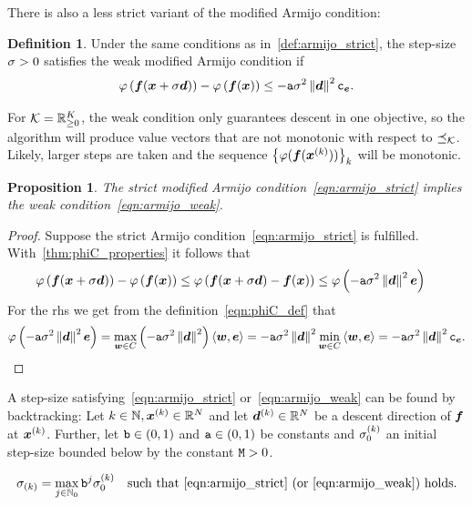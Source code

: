 \documentclass{article}
\theoremstyle{plain}
\newtheorem{proposition}[theorem]{Proposition}
\theoremstyle{definition}
\newtheorem{definition}[theorem]{Definition}
\begin{document}
There is also a less strict variant of the modified Armijo condition:
\begin{definition}
	Under the same conditions as in~\cref{def:armijo_strict},
	the step-size $\sigma > 0$ satisfies the weak modified Armijo condition if 
	\begin{equation}
		\varphi\left(\bm{f}(\bm{x} + \sigma\bm{d})\right)
		- 
		\varphi\left(\bm{f}(\bm{x})\right)
		\leq
		-
		\mathtt{a} \sigma^2 \left\|\bm{d}\right\|^2 \mathtt{c}_{\bm{e}}.
		\label{eqn:armijo_weak}
	\end{equation}
\end{definition}
For $\mathcal K = \mathbb R^K_{\geq 0}$, the weak condition only guarantees descent in one objective,
so the algorithm will produce value vectors that are not monotonic with respect to $\preceq_\mathcal K$.
Likely, larger steps are taken and the sequence $\left\{\varphi(\bm{f}(\bm{x}^{(k)}))\right\}_k$ will be monotonic.
\begin{proposition}
	The strict modified Armijo condition~\eqref{eqn:armijo_strict} implies the weak 
	condition~\eqref{eqn:armijo_weak}.
\end{proposition}
\begin{proof}
	Suppose the strict Armijo condition~\eqref{eqn:armijo_strict} is fulfilled.
	With~\cref{thm:phiC_properties} it follows that 
	\begin{align*}
	\varphi\left(
		\bm{f}(\bm{x} + \sigma \bm{d})
	\right)
	-
	\varphi\left(
		\bm{f}(\bm{x})
	\right)
	&\le
	\varphi\left(
		\bm{f}(\bm{x} + \sigma \bm{d})
		-
		\bm{f}(\bm{x})
	\right)
	\le
	\varphi\left(
	- \mathtt{a} \sigma^2 \left\|\bm{d}\right\|^2 \bm{e}
	\right)
	\end{align*}
	For the \ac{rhs} we get from the definition~\eqref{eqn:phiC_def} that
	$$
	\varphi\left(
	- \mathtt{a} \sigma^2 \left\|\bm{d}\right\|^2 \bm{e}
	\right)
	=
	\max_{\bm{w} \in C}
	\left(- \mathtt{a} \sigma^2 \left\|\bm{d}\right\|^2\right)
	\left\langle \bm{w}, \bm{e} \right\rangle
	= 
	- \mathtt{a} \sigma^2 \left\|\bm{d}\right\|^2
	\min_{\bm{w}\in C}
	\left\langle \bm{w}, \bm{e} \right\rangle
	=
	- \mathtt{a} \sigma^2 \left\|\bm{d}\right\|^2
	\mathtt{c}_{\bm{e}}.
	$$
\end{proof}

A step-size satisfying~\eqref{eqn:armijo_strict} or~\eqref{eqn:armijo_weak} 
can be found by backtracking:
Let $k \in \mathbb N, \bm{x}^{(k)}\in \mathbb R^N$ and let $\bm{d}^{(k)}\in \mathbb R^N$ be a descent direction
of $\bm{f}$ at $\bm{x}^{(k)}$. Further, let 
$\mathtt{b} \in (0,1)$ and $\mathtt{a} \in (0,1)$ be constants and 
$\sigma^{(k)}_{0}$ an initial step-size bounded below by the constant $\mathtt{M}>0$.

\begin{equation}
	\sigma_{(k)} 
	= 
		\max_{j\in \mathbb N_0} \mathtt{b}^j\sigma^{(k)}_{0}
		\quad\text{such that~\eqref{eqn:armijo_strict} (or~\eqref{eqn:armijo_weak}) holds.}
\label{eqn:backtracking_stepsize}
\end{equation}
\end{document}
